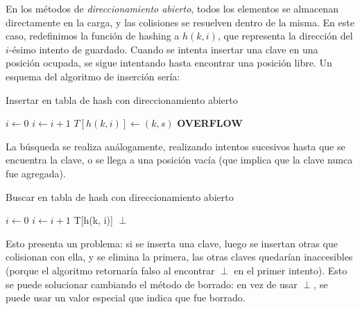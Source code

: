 \documentclass{article}
\begin{document}
En los métodos de \textit{direccionamiento abierto}, todos los elementos se almacenan directamente en la carga, y las colisiones se resuelven dentro de la misma. En este caso, redefinimos la función de hashing a $h(k, i)$, que representa la dirección del $i$-ésimo intento de guardado. Cuando se intenta insertar una clave en una posición ocupada, se sigue intentando hasta encontrar una posición libre. Un esquema del algoritmo de inserción sería:
\begin{algorithm}[H]
    \caption*{Insertar en tabla de hash con direccionamiento abierto}
    \begin{algorithmic}
        \State $i \gets 0$
        \State $i \gets i + 1$
        \EndWhile
        \State $T[h(k, i)] \gets (k, s)$
        \Else
        \State \textbf{OVERFLOW}
        \EndIf
        \EndFunction
    \end{algorithmic}
\end{algorithm}

La búsqueda se realiza análogamente, realizando intentos sucesivos hasta que se encuentra la clave, o se llega a una posición vacía (que implica que la clave nunca fue agregada).
\begin{algorithm}[H]
    \caption*{Buscar en tabla de hash con direccionamiento abierto}
    \begin{algorithmic}
        \State $i \gets 0$
        \State $i \gets i + 1$
        \EndWhile
        \State \Return T[h(k, i)]
        \Else
        \State \Return $\perp$
        \EndIf
        \EndFunction
    \end{algorithmic}
\end{algorithm}

Esto presenta un problema: si se inserta una clave, luego se insertan otras que colisionan con ella, y se elimina la primera, las otras claves quedarían inaccesibles (porque el algoritmo retornaría falso al encontrar $\perp$ en el primer intento). Esto se puede solucionar cambiando el método de borrado: en vez de usar $\perp$, se puede usar un valor especial que indica que fue borrado.
\end{document}

